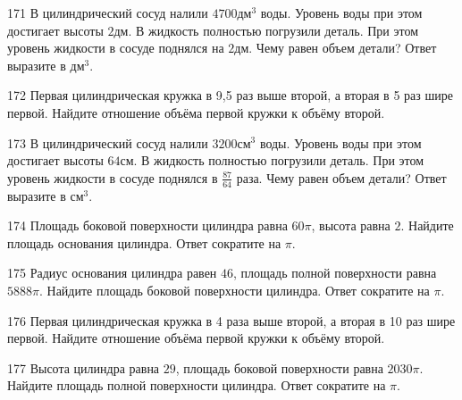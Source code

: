 \documentclass[4apaper]{article}
\begin{document}
\begin{taskBN}{171}
В цилиндрический сосуд налили $4700\mbox{дм}^3$ воды. Уровень воды при этом достигает высоты $2$дм. В жидкость полностью погрузили деталь. При этом уровень жидкости в сосуде поднялся на $2$дм. Чему равен объем детали? Ответ выразите в $\mbox{дм}^3$.
\end{taskBN}

\begin{taskBN}{172}
 Первая цилиндрическая кружка в 9,5 раз выше второй, а вторая в 5 раз шире первой. Найдите отношение объёма первой кружки к объёму второй.
\end{taskBN}

\begin{taskBN}{173}
В цилиндрический сосуд налили $3200\mbox{см}^3$ воды. Уровень воды при этом достигает высоты $64$см. В жидкость полностью погрузили деталь. При этом уровень жидкости в сосуде поднялся в $\frac{87}{64}$ раза. Чему равен объем детали? Ответ выразите в $\mbox{см}^3$.
\end{taskBN}

\begin{taskBN}{174}
Площадь боковой поверхности цилиндра равна $60\pi$, высота равна $2$. Найдите площадь основания цилиндра. Ответ сократите на $\pi$.
\end{taskBN}

\begin{taskBN}{175}
Радиус основания цилиндра равен $46$, площадь полной поверхности равна $5888\pi$. Найдите площадь боковой поверхности цилиндра. Ответ сократите на $\pi$.
\end{taskBN}

\begin{taskBN}{176}
 Первая цилиндрическая кружка в 4 раза выше второй, а вторая в 10 раз шире первой. Найдите отношение объёма первой кружки к объёму второй.
\end{taskBN}

\begin{taskBN}{177}
Высота цилиндра равна $29$, площадь боковой поверхности равна $2030\pi$. Найдите площадь полной поверхности цилиндра. Ответ сократите на $\pi$.
\end{taskBN}
\end{document}
